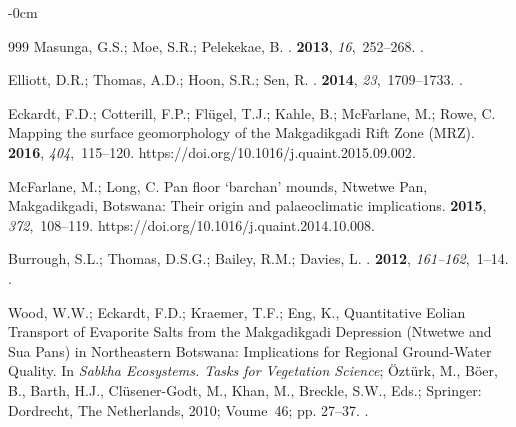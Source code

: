 \documentclass[ijgi,article,accept,pdftex,moreauthors]{Definitions/mdpi}
\begin{document}
\begin{adjustwidth}{-\extralength}{0cm}
\begin{thebibliography}{999}
Masunga, G.S.; Moe, S.R.; Pelekekae, B.
.
 {\bf 2013}, {\em 16},~252--268.
.

Elliott, D.R.; Thomas, A.D.; Hoon, S.R.; Sen, R.
.
 {\bf 2014}, {\em 23},~1709--1733.
.

Eckardt, F.D.; Cotterill, F.P.; Flügel, T.J.; Kahle, B.; McFarlane, M.; Rowe,
  C.
\newblock Mapping the surface geomorphology of the Makgadikgadi Rift Zone
  (MRZ).
 {\bf 2016}, {\em 404},~115--120.
  {{https://doi.org/10.1016/j.quaint.2015.09.002}}.

McFarlane, M.; Long, C.
\newblock Pan floor ‘barchan’ mounds, Ntwetwe Pan, Makgadikgadi, Botswana:
  Their origin and palaeoclimatic implications.
 {\bf 2015}, {\em 372},~108--119.
  {{https://doi.org/10.1016/j.quaint.2014.10.008}}.

Burrough, S.L.; Thomas, D.S.G.; Bailey, R.M.; Davies, L.
.
 {\bf 2012}, {\em 161--162},~1--14.
.

Wood, W.W.; Eckardt, F.D.; Kraemer, T.F.; Eng, K., {Quantitative Eolian
  Transport of Evaporite Salts from the Makgadikgadi Depression (Ntwetwe and
  Sua Pans) in Northeastern Botswana: Implications for Regional Ground-Water
  Quality}.
\newblock In {\em {Sabkha Ecosystems. Tasks for Vegetation Science}}; Öztürk, M., Böer, B., Barth, H.J., Clüsener-Godt, M., Khan, M.,  Breckle, S.W., Eds.;  Springer:  Dordrecht, The Netherlands,  2010; Voume~46; pp. 27--37.
.


\end{thebibliography}
\end{adjustwidth}
\end{document}
